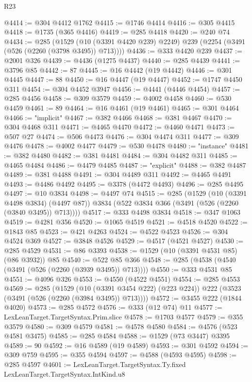 \begin{lexlean}{R23}
\begin{coremodule}
@4414 := @304 @4412 @1762
@4415 := @1746 @4414
@4416 := @305 @4415
@4418 := @1735 (@365 @4416)
@4419 := @285 @4418
@4420 := @240 @74
@4434 := @285
    (@1529 (@10 (@3391 @4420 @239) @2249) @239 (@2254 (@3491 (@526 (@2260 (@3798 @3495)) @713))))
@4436 := @333 @4420 @239
@4437 := @2001 @326
@4439 := @4436 (@1275 @4437)
@4440 := @285 @4439
@4441 := @3796 @85
@4442 := 87
@4445 := @16 @4442 (@19 @4442)
@4446 := @301 @4445
@4447 := 88
@4450 := @16 @4447 (@19 @4447)
@4452 := @1747 @4450 @311
@4454 := @304 @4452 @3947
@4456 := @4441 (@4446 @4454)
@4457 := @285 @4456
@4458 := @309 @3579
@4459 := @4002 @4458
@4460 := @530 @4459
@4461 := 89
@4464 := @16 @4461 (@19 @4461)
@4465 := @301 @4464
@4466 := "implicit"
@4467 := @382 @4466
@4468 := @381 @4467
@4470 := @304 @4468 @311
@4471 := @4465 @4470
@4472 := @4460 @4471
@4473 := @507 @27
@4474 := @506 @4473
@4476 := @304 @4474 @311
@4477 := @309 @4476
@4478 := @4002 @4477
@4479 := @530 @4478
@4480 := "instance"
@4481 := @382 @4480
@4482 := @381 @4481
@4484 := @304 @4482 @311
@4485 := @4465 @4484
@4486 := @4479 @4485
@4487 := "explicit"
@4488 := @382 @4487
@4489 := @381 @4488
@4491 := @304 @4489 @311
@4492 := @4465 @4491
@4493 := @4486 @4492
@4495 := @3378 (@4472 @4493)
@4496 := @285 @4495
@4497 := @10 @3834
@4498 := @4497 @74
@4515 := @285
    (@1529
      (@10 (@3391 @4498 @3834) (@4497 @87))
      @3834
      (@522 @3834 @366 (@3491 (@526 (@2260 (@3840 @3495)) @713))))
@4517 := @333 @4498 @3834
@4518 := @347 @1063
@4519 := @4281 @356
@4520 := @1065 @4519
@4521 := @4518 @4520
@4522 := @1843 @85
@4523 := @421 @4263
@4524 := @4522 @4523
@4526 := @304 @4524 @369
@4527 := @3848 @4526
@4529 := @4517 (@4521 @4527)
@4530 := @285 @4529
@4531 := @86 @3393
@4538 := @1529 (@10 (@3391 @4531 @85) (@86 @3932)) @85
@4540 := @522 @85 @366
@4548 := @285 (@4538 (@4540 (@3491 (@526 (@2260 (@3939 @3495)) @713))))
@4550 := @333 @4531 @85
@4551 := @4096 @326
@4553 := @4550 (@4522 @4551)
@4554 := @285 @4553
@4569 := @285
    (@1529
      (@10 (@3391 @3454 @222) (@223 @224))
      @222
      (@3523 (@3491 (@526 (@2260 (@3984 @3495)) @713))))
@4572 := @3455 @222 (@1844 @4020)
@4573 := @285 @4572
@4576 := @333 (@12 @74) @11
@4577 := LexLeanTarget.TargetSyntax.Prim.slice
@4578 := @1703 @4577
@4579 := @355 @3579
@4580 := @309 @4579
@4581 := @4578 @4580
@4584 := @4576 (@523 @4581 @3475)
@4585 := @285 @4584
@4588 := @1529 (@73 @3447) @3395
@4589 := 90
@4592 := @16 @4589 (@19 @4589)
@4593 := @301 @4592
@4594 := @309 @759
@4595 := @355 @4594
@4597 := @4588 (@4593 @4595)
@4598 := @285 @4597
@4601 := LexLeanTarget.TargetSyntax.Ty.fixed LexLeanTarget.TargetSyntax.IntKind.u8

\end{coremodule}
\end{lexlean}
